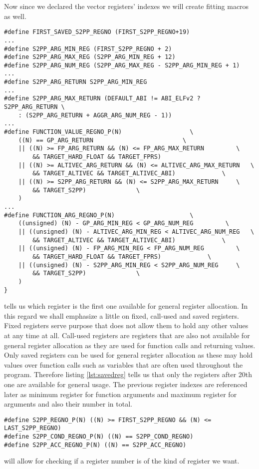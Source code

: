 Now since we declared the vector registers' indexes we will create fitting macros as well.
\begin{lstlisting}[label=lst:savedreg]
#define FIRST_SAVED_S2PP_REGNO (FIRST_S2PP_REGNO+19)
...
#define S2PP_ARG_MIN_REG (FIRST_S2PP_REGNO + 2)
#define S2PP_ARG_MAX_REG (S2PP_ARG_MIN_REG + 12)
#define S2PP_ARG_NUM_REG (S2PP_ARG_MAX_REG - S2PP_ARG_MIN_REG + 1)
...
#define S2PP_ARG_RETURN S2PP_ARG_MIN_REG
...
#define S2PP_ARG_MAX_RETURN (DEFAULT_ABI != ABI_ELFv2 ? S2PP_ARG_RETURN \
    : (S2PP_ARG_RETURN + AGGR_ARG_NUM_REG - 1))
...
#define FUNCTION_VALUE_REGNO_P(N)                   \
    ((N) == GP_ARG_RETURN                         \
    || ((N) >= FP_ARG_RETURN && (N) <= FP_ARG_MAX_RETURN         \
        && TARGET_HARD_FLOAT && TARGET_FPRS)
    || ((N) >= ALTIVEC_ARG_RETURN && (N) <= ALTIVEC_ARG_MAX_RETURN   \
        && TARGET_ALTIVEC && TARGET_ALTIVEC_ABI)             \
    || ((N) >= S2PP_ARG_RETURN && (N) <= S2PP_ARG_MAX_RETURN     \
        && TARGET_S2PP)              \
    )
...
#define FUNCTION_ARG_REGNO_P(N)                     \
    ((unsigned) (N) - GP_ARG_MIN_REG < GP_ARG_NUM_REG         \
    || ((unsigned) (N) - ALTIVEC_ARG_MIN_REG < ALTIVEC_ARG_NUM_REG   \
        && TARGET_ALTIVEC && TARGET_ALTIVEC_ABI)             \
    || ((unsigned) (N) - FP_ARG_MIN_REG < FP_ARG_NUM_REG         \
        && TARGET_HARD_FLOAT && TARGET_FPRS)             \
    || ((unsigned) (N) - S2PP_ARG_MIN_REG < S2PP_ARG_NUM_REG     \
        && TARGET_S2PP)              \
    )
}
\end{lstlisting} \todo{shorten this}
tells us which register is the first one available for general register allocation.
In this regard we shall emphasize a little on fixed, call-used and saved registers.
Fixed registers serve purpose that does not allow them to hold any other values at any time at all.
Call-used registers are registers that are also not available for general register allocation as they are used for function calls and returning values.
Only saved registers can be used for general register allocation as these may hold values over function calls such as variables that are often used throughout the program.
Therefore listing \ref{lst:savedreg} tells us that only the registers after 20th one are available for general usage. 
The previous register indexes are referenced later as minimum register for function arguments and maximum register for arguments and also their number in total.

\begin{lstlisting}
#define S2PP_REGNO_P(N) ((N) >= FIRST_S2PP_REGNO && (N) <= LAST_S2PP_REGNO)
#define S2PP_COND_REGNO_P(N) ((N) == S2PP_COND_REGNO)
#define S2PP_ACC_REGNO_P(N) ((N) == S2PP_ACC_REGNO)
\end{lstlisting} \todo{unnecessary}
will allow for checking if a register number is of the kind of register we want.

